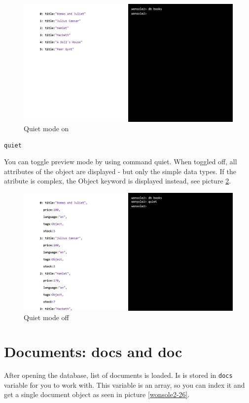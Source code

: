 \documentclass[10pt,a4paper,oneside]{report}
\begin{document}
\begin{figure}
\centering
\includegraphics[width=\textwidth]{screenshot/wonsole2/wonsole2-18.png}
\caption{Quiet mode on}
\label{wonsole2-18}
\end{figure}

\begin{verbatim}
quiet
\end{verbatim}

You can toggle preview mode by using command quiet. When toggled off, all
attributes of the object are displayed - but only the simple data types. If the
atribute is complex, the Object keyword is displayed instead, see picture
\ref{wonsole2-20}.

\begin{figure}
\centering
\includegraphics[width=\textwidth]{screenshot/wonsole2/wonsole2-20.png}
\caption{Quiet mode off}
\label{wonsole2-20}
\end{figure}


\section{Documents: docs and doc}
After opening the database, list of documents is loaded. Is is stored in
\verb|docs| variable for you to work with. This variable is an array, so you can
index it and get a single document object as seen in picture \ref{wonsole2-26}.
\end{document}
